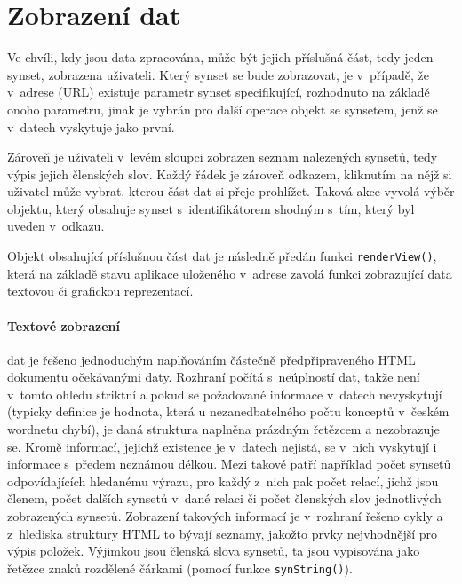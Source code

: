 \documentclass[a4paper, 11pt, oneside, showtrims]{book}
\begin{document}
			\section{Zobrazení dat}

				Ve chvíli, kdy jsou data zpracována, může být jejich příslušná část, tedy jeden synset, zobrazena uživateli. Který synset se bude zobrazovat, je v~případě, že v~adrese (URL) existuje parametr synset specifikující, rozhodnuto na základě onoho parametru, jinak je vybrán pro další operace objekt se synsetem, jenž se v~datech vyskytuje jako první. 

				Zároveň je uživateli v~levém sloupci zobrazen seznam nalezených synsetů, tedy výpis jejich členských slov. Každý řádek je zároveň odkazem, kliknutím na nějž si uživatel může vybrat, kterou část dat si přeje prohlížet. Taková akce vyvolá výběr objektu, který obsahuje synset s~identifikátorem shodným s~tím, který byl uveden v~odkazu.

				Objekt obsahující příslušnou část dat je následně předán funkci \texttt{renderView()}, která na základě stavu aplikace uloženého v~adrese zavolá funkci zobrazující data textovou či grafickou reprezentací.

				\paragraph{Textové zobrazení} dat je řešeno jednoduchým naplňováním částečně předpřipraveného HTML dokumentu očekávanými daty. Rozhraní počítá s~neúplností dat, takže není v~tomto ohledu striktní a pokud se požadované informace v~datech nevyskytují (typicky definice je hodnota, která u nezanedbatelného počtu konceptů v~českém wordnetu chybí), je daná struktura naplněna prázdným řetězcem a nezobrazuje se. Kromě informací, jejichž existence je v~datech nejistá, se v~nich vyskytují i informace s~předem neznámou délkou. Mezi takové patří například počet synsetů odpovídajících hledanému výrazu, pro každý z~nich pak počet relací, jichž jsou členem, počet dalších synsetů v~dané relaci či počet členských slov jednotlivých zobrazených synsetů. Zobrazení takových informací je v~rozhraní řešeno cykly a z~hlediska struktury HTML to bývají seznamy, jakožto prvky nejvhodnější pro výpis položek. Výjimkou jsou členská slova synsetů, ta jsou vypisována jako řetězce znaků rozdělené čárkami (pomocí funkce \texttt{synString()}).
\end{document}
